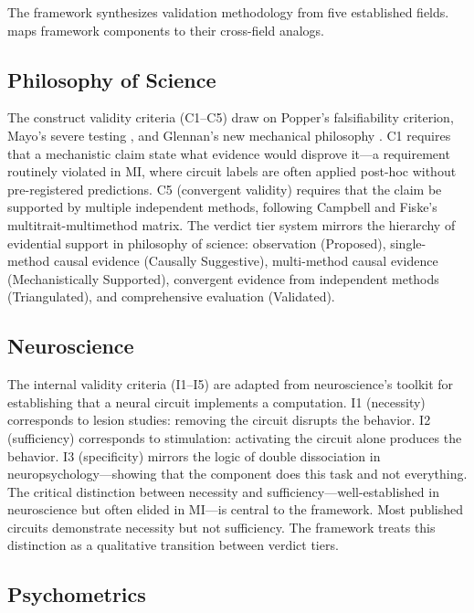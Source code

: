 \documentclass[10pt]{article}
\begin{document}
The framework synthesizes validation methodology from five established fields.  maps framework components to their cross-field analogs.

\subsection{Philosophy of Science}

The construct validity criteria (C1--C5) draw on Popper's falsifiability criterion, Mayo's severe testing \citep{mayo2018statistical}, and Glennan's new mechanical philosophy \citep{glennan2017new}. C1 requires that a mechanistic claim state what evidence would disprove it---a requirement routinely violated in MI, where circuit labels are often applied post-hoc without pre-registered predictions. C5 (convergent validity) requires that the claim be supported by multiple independent methods, following Campbell and Fiske's multitrait-multimethod matrix. The verdict tier system mirrors the hierarchy of evidential support in philosophy of science: observation (Proposed), single-method causal evidence (Causally Suggestive), multi-method causal evidence (Mechanistically Supported), convergent evidence from independent methods (Triangulated), and comprehensive evaluation (Validated).

\subsection{Neuroscience}

The internal validity criteria (I1--I5) are adapted from neuroscience's toolkit for establishing that a neural circuit implements a computation. I1 (necessity) corresponds to lesion studies: removing the circuit disrupts the behavior. I2 (sufficiency) corresponds to stimulation: activating the circuit alone produces the behavior. I3 (specificity) mirrors the logic of double dissociation in neuropsychology---showing that the component does this task and not everything. The critical distinction between necessity and sufficiency---well-established in neuroscience but often elided in MI---is central to the framework. Most published circuits demonstrate necessity but not sufficiency. The framework treats this distinction as a qualitative transition between verdict tiers.

\subsection{Psychometrics}
\end{document}
